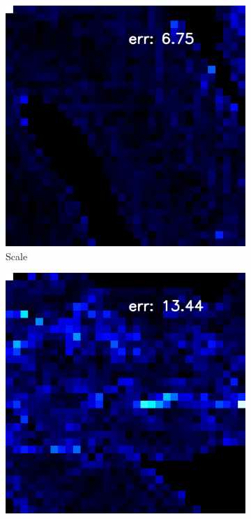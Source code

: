 \begin{figure}[th]
	\begin{subfigure}[b]{0.18\linewidth}
		\includegraphics[width=\linewidth]{./Figures/gcnn_synthetic/eval_7_22_-8_error.png}
		\caption{Scale}
	\end{subfigure}
	\begin{subfigure}[b]{0.18\linewidth}
		\includegraphics[width=\linewidth]{./Figures/gcnn_synthetic/eval_7_2_22_error.png}

\end{subfigure}
\end{figure}
